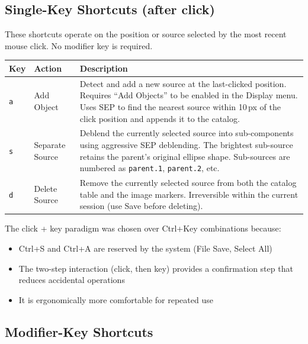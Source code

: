 \documentclass[11pt,fleqn]{book}
\begin{document}
\subsection{Single-Key Shortcuts (after click)}

These shortcuts operate on the position or source selected by the most recent mouse click. No modifier key is required.

\begin{center}
\begin{longtable}{C{1.5cm} L{3.5cm} L{7.5cm}}
\toprule
\textbf{Key} & \textbf{Action} & \textbf{Description} \\
\midrule
\endhead
\texttt{a} & Add Object & Detect and add a new source at the last-clicked position. Requires ``Add Objects'' to be enabled in the Display menu. Uses SEP to find the nearest source within 10\,px of the click position and appends it to the catalog. \\
\midrule
\texttt{s} & Separate Source & Deblend the currently selected source into sub-components using aggressive SEP deblending. The brightest sub-source retains the parent's original ellipse shape. Sub-sources are numbered as \texttt{parent.1}, \texttt{parent.2}, etc. \\
\midrule
\texttt{d} & Delete Source & Remove the currently selected source from both the catalog table and the image markers. Irreversible within the current session (use Save before deleting). \\
\bottomrule
\end{longtable}
\end{center}

\begin{remark}
The click + key paradigm was chosen over Ctrl+Key combinations because:
\begin{itemize}[leftmargin=2em]
  \item Ctrl+S and Ctrl+A are reserved by the system (File Save, Select All)
  \item The two-step interaction (click, then key) provides a confirmation step that reduces accidental operations
  \item It is ergonomically more comfortable for repeated use
\end{itemize}
\end{remark}

\subsection{Modifier-Key Shortcuts}
\end{document}
